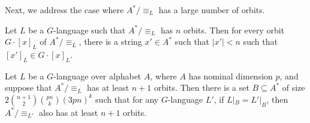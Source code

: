 \documentclass[runningheads]{llncs}
\newif\ifappendix
\begin{document}
Next, we address the case where $A^* / \equiv_L$ has a large number of orbits.

\begin{lemma} \label{lem:short witnesses to distinct equiv_L classes}
    Let $L$ be a $G$-language such that $A^* / \equiv_L$ has $n$ orbits. 
    Then for every orbit $G \cdot [x]_L$ of $A^* / \equiv_L$, there is a string $x' \in A^*$ such that $|x'| < n$ such that $[x']_L \in G \cdot [x]_L$. 
\end{lemma}

\ifappendix The proof of \autoref{lem:short witnesses to distinct equiv_L classes} is given in Appendix \ref{appendix:proof of short witnesses to distinct equiv_L classes}. \fi

\begin{proposition} \label{prop:many orbits of L witnessed by small set}
    Let $L$ be a $G$-language over alphabet $A$, where $A$ has nominal dimension $p$, and suppose that $A^* / \equiv_L$ has at least $n+1$ orbits. 
    Then there is a set $B \subseteq A^*$ of size $2 \binom{n+1}{2} \binom{pn}{k} (3pn)^k$ such that for any $G$-language $L'$, if $L|_B = L'|_B$, then $A^* / \equiv_{L'}$ also has at least $n+1$ orbits.
\end{proposition}
\end{document}
